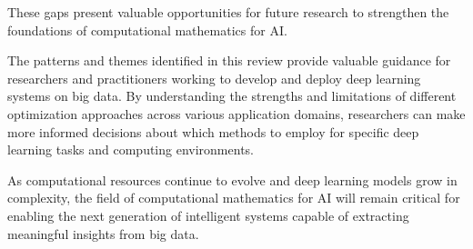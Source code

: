 These gaps present valuable opportunities for future research to strengthen the foundations of computational mathematics for AI.

The patterns and themes identified in this review provide valuable guidance for researchers and practitioners working to develop and deploy deep learning systems on big data. By understanding the strengths and limitations of different optimization approaches across various application domains, researchers can make more informed decisions about which methods to employ for specific deep learning tasks and computing environments.

As computational resources continue to evolve and deep learning models grow in complexity, the field of computational mathematics for AI will remain critical for enabling the next generation of intelligent systems capable of extracting meaningful insights from big data.
